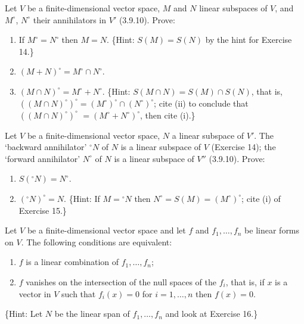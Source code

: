 \begin{tcolorbox}[title=Exercise 15, breakable]
    Let $V$ be a finite-dimensional vector space, $M$ and $N$ linear subspaces 
    of $V$, and $M^\circ$, $N^\circ$ their annihilators in $V'$ (3.9.10). Prove:
    \begin{enumerate}
        \item[(i)] If $M^\circ = N^\circ$ then $M = N$. \{Hint: $S(M) = S(N)$ by the hint for 
        Exercise 14.\}
        \item[(ii)] $(M + N)^\circ = M^\circ \cap N^\circ$.
        \item[(iii)] $(M \cap N)^\circ = M^\circ + N^\circ$. \{Hint: $S(M \cap N) = S(M) \cap S(N)$, that is, 
        $((M \cap N)^\circ)^\circ = (M^\circ)^\circ \cap (N^\circ)^\circ$; cite (ii) to conclude that $((M \cap N)^\circ)^\circ$ 
        $= (M^\circ + N^\circ)^\circ$, then cite (i).\}
    \end{enumerate}
\end{tcolorbox}

\begin{tcolorbox}[title=Exercise 16, breakable]
    Let $V$ be a finite-dimensional vector space, $N$ a linear subspace of $V'$. 
    The `backward annihilator' ${}^\circ N$ of $N$ is a linear subspace of $V$ (Exercise 
    14); the `forward annihilator' $N^\circ$ of $N$ is a linear subspace of $V''$ 
    (3.9.10). Prove:
    \begin{enumerate}
        \item[(i)] $S({}^\circ N) = N^\circ$.
        \item[(ii)] $({}^\circ N)^\circ = N$. \{Hint: If $M = {}^\circ N$ then $N^\circ = S(M) = (M^\circ)^\circ$; cite (i) of 
        Exercise 15.\}
    \end{enumerate}
\end{tcolorbox}

\begin{tcolorbox}[title=Exercise 17, breakable]
    Let $V$ be a finite-dimensional vector space and let $f$ and $f_1, \ldots, f_n$ be 
    linear forms on $V$. The following conditions are equivalent:
    \begin{enumerate}
        \item[(a)] $f$ is a linear combination of $f_1, \ldots, f_n$;
        \item[(b)] $f$ vanishes on the intersection of the null spaces of the $f_i$, that is, if 
        $x$ is a vector in $V$ such that $f_i(x) = 0$ for $i = 1, \ldots, n$ then $f(x) = 0$.
    \end{enumerate}
    \{Hint: Let $N$ be the linear span of $f_1, \ldots, f_n$ and look at Exercise 16.\}
\end{tcolorbox}

